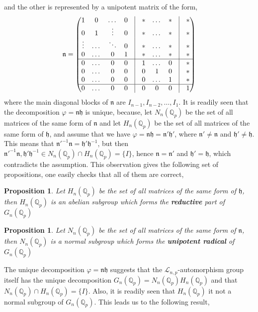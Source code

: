 \documentclass[12pt]{article}
\newtheorem{proposition}[theorem]{Proposition}
\begin{document}
and the other is represented by a unipotent matrix of the form, \[\mathfrak{n}=\begin{pmatrix}
1 &0 &\dots &0 &\vline &* &\dots &* &\vline& *\\
0& 1 &\vdots &0 &\vline&* &\dots &* &\vline&*\\
\vdots& \dots& \ddots & 0&\vline& *& \dots& *&\vline & *\\
0& \dots& 0& 1&\vline & * & \dots & * &\vline & *\\
\hline
0&\dots &0 & 0& \vline &1&\dots &0&\vline&*\\
0&\dots &0 & 0& \vline & 0 & 1 & 0 &\vline &*\\
0&\dots &0 & 0& \vline & 0 & \dots & 1 &\vline &*\\
\hline
0&\dots &0 & 0& \vline & 0 & 0 & 0 &\vline &1\\
\end{pmatrix}
\]
where the main diagonal blocks of $\mathfrak{n}$ are $I_{n-1},I_{n-2},\dots,I_1$. It is readily seen that the decomposition $\varphi=\mathfrak{nh}$ is unique, because, let $N_n(\mathbb{Q}_p)$ be the set of all matrices of the same form of $\mathfrak{n}$ and let $ H_n(\mathbb{Q}_p)$ be the set of all matrices of the same form of $\mathfrak{h}$, and assume that we have $\varphi=\mathfrak{nh}=\mathfrak{n'h'}$, where $\mathfrak{n}'\neq \mathfrak{n}$ and $\mathfrak{h}'\neq \mathfrak{h}$. This means that $\mathfrak{n}'^{-1}\mathfrak{n}=\mathfrak{h}'\mathfrak{h}^{-1}$, but then $\mathfrak{n}'^{-1}\mathfrak{n},\mathfrak{h}'\mathfrak{h}^{-1}\in N_n(\mathbb{Q}_p)\cap H_n(\mathbb{Q}_p)=\{I\}$, hence $\mathfrak{n}=\mathfrak{n}'$ and $\mathfrak{h}'=\mathfrak{h}$, which contradicts the assumption.
This observation gives the following set of propositions, one easily checks that all of them are correct,
\begin{proposition}
\label{prop.automorphism.subgroup.h}
Let $H_n(\mathbb{Q}_p)$ be the set of all matrices of the same form of $\mathfrak{h}$, then $ H_n(\mathbb{Q}_p)$ is an abelian subgroup which forms the \textbf{reductive} part of $G_n(\mathbb{Q}_p)$
\end{proposition}
\begin{proposition}
\label{prop.automorphism.subgroup.n}
Let $N_n(\mathbb{Q}_p)$ be the set of all matrices of the same form of $\mathfrak{n}$, then $N_n(\mathbb{Q}_p)$ is a normal subgroup which forms the \textbf{unipotent radical} of $G_n(\mathbb{Q}_p)$
\end{proposition}
The unique decomposition $\varphi=\mathfrak{nh}$ suggests that the $\mathcal{L}_{n,p}$-automorphism group itself has the unique decomposition $G_n(\mathbb{Q}_p)= N_n(\mathbb{Q}_p) H_n(\mathbb{Q}_p)$ and that $N_n(\mathbb{Q}_p)\cap H_n(\mathbb{Q}_p)=\{I\}$. Also, it is readily seen that $ H_n(\mathbb{Q}_p)$ it not a normal subgroup of $G_n(\mathbb{Q}_p)$. This leads us to the following result,
\end{document}
